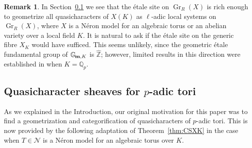 \documentclass[10pt]{amsart}
\theoremstyle{plain}
\theoremstyle{definition}
\newtheorem{remark}[theorem]{Remark}
\newcommand{\ZZ}{{\mathbb{Z}}}
\newcommand{\Gm}[1]{\mathbb{G}_{\hskip-1pt\textbf{m},#1}}
\DeclareMathOperator{\Gr}{Gr}
\begin{document}
 \begin{remark}
In Section~\ref{ssec:CS_tori} we see that the \'etale site on $\Gr_R(X)$ is rich enough to geometrize all
quasicharacters of $X(K)$ as $\ell$-adic local systems on $\Gr_R(X)$, where $X$ is a N\'eron model for an
algebraic torus or an abelian variety over a local field $K$. 
It is natural to ask if the \'etale site on the generic fibre $X_K$ would have sufficed.
This seems unlikely, since the geometric \'etale fundamental group of $\Gm{K}$ is ${\hat \ZZ}$;
however, limited results in this direction were established in \cite{Cunningham-Kamgarpour} when $K = \mathbb{Q}_p$.
\end{remark}


\subsection{Quasicharacter sheaves for $p$-adic tori} \label{ssec:CS_tori}

As we explained in the Introduction, our original motivation for this paper was to find a
geometrization and categorification of quasicharacters of $p$-adic tori. 
This is now provided by the following adaptation of Theorem~\ref{thm:CSXK} in the case when
$T\in \mathcal{N}$ is a N\'eron model for an algebraic torus over $K$.
\end{document}
